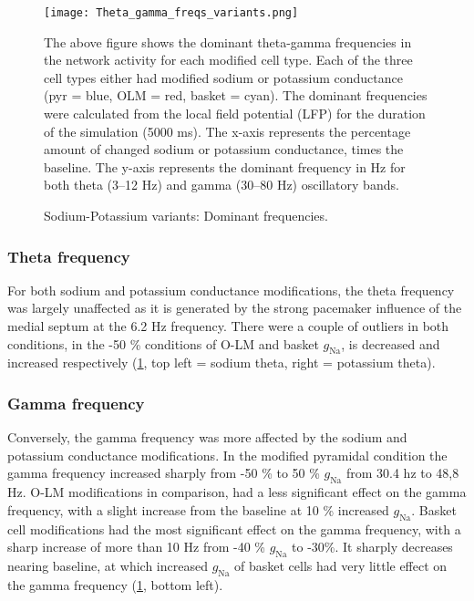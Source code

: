 \begin{figure}[htbp]
    \centering
    \texttt{[image: Theta\_gamma\_freqs\_variants.png]}
    \caption[Sodium-Potassium variants: Dominant frequencies]{Sodium-Potassium variants: Dominant frequencies.}\label{fig:sodium_potassium_frequencies}
    \begin{minipage}{0.9\textwidth}
        The above figure shows the dominant theta-gamma frequencies in the network activity for each modified cell type.
        Each of the three cell types either had modified sodium or potassium conductance (pyr = blue, OLM = red, basket = cyan).
        The dominant frequencies were calculated from the local field potential (LFP) for the duration of the simulation (5000 ms).
        The x-axis represents the percentage amount of changed sodium or potassium conductance, times the baseline.
        The y-axis represents the dominant frequency in Hz for both theta (3--12 Hz) and gamma (30--80 Hz) oscillatory bands.
    \end{minipage}
\end{figure}

\subsubsection{Theta frequency}
For both sodium and potassium conductance modifications, the theta frequency was largely unaffected as it is generated by the strong pacemaker influence of the medial septum at the 6.2 Hz frequency.
There were a couple of outliers in both conditions, in the -50 \% conditions of O-LM and basket \(g_{\text{Na}}\), is decreased and increased respectively (\ref{fig:sodium_potassium_frequencies}, top left = sodium theta, right = potassium theta).

\subsubsection{Gamma frequency}
Conversely, the gamma frequency was more affected by the sodium and potassium conductance modifications.
In the modified pyramidal condition the gamma frequency increased sharply from -50 \% to 50 \% \(g_{\text{Na}}\) from 30.4 hz to 48,8 Hz.
O-LM modifications in comparison, had a less significant effect on the gamma frequency, with a slight increase from the baseline at 10 \% increased \(g_{\text{Na}}\).
Basket cell modifications had the most significant effect on the gamma frequency, with a sharp increase of more than 10 Hz from -40 \% \(g_{\text{Na}}\) to -30\%.
It sharply decreases nearing baseline, at which increased \(g_{\text{Na}}\) of basket cells had very little effect on the gamma frequency (\ref{fig:sodium_potassium_frequencies}, bottom left).

